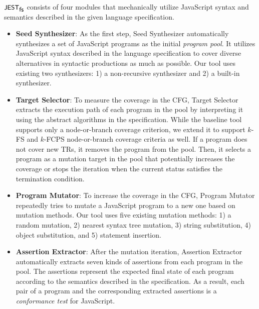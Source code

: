 $\textsf{\small JEST}_{\textsf{\small fs}}$ consists of four modules that mechanically utilize JavaScript syntax and
semantics described in the given language specification.
\begin{itemize}
  \item \textsf{\textbf{Seed Synthesizer}}:
    As the first step, \textsf{Seed Synthesizer} automatically synthesizes a set
    of JavaScript programs as the initial \textit{program pool}.
    It utilizes JavaScript syntax described in the language specification to
    cover diverse alternatives in syntactic productions as much as possible.
    Our tool uses existing two synthesizers: 1) a non-recursive synthesizer and
    2) a built-in synthesizer.
  \item \textsf{\textbf{Target Selector}}:
    To measure the coverage in the CFG, \textsf{Target Selector} extracts the
    execution path of each program in the pool by interpreting it using the
    abstract algorithms in the specification.
    While the baseline tool supports only a node-or-branch coverage criterion,
    we extend it to support $k$-FS and $k$-FCPS node-or-branch coverage
    criteria as well.
    If a program does not cover new TRs, it removes the program from the pool.
    Then, it selects a program as a mutation target in the pool that potentially
    increases the coverage or stops the iteration when the current status
    satisfies the termination condition.
  \item \textsf{\textbf{Program Mutator}}:
    To increase the coverage in the CFG, \textsf{Program Mutator} repeatedly
    tries to mutate a JavaScript program to a new one based on mutation methods.
    Our tool uses five existing mutation methods: 1) a random mutation, 2)
    nearest syntax tree mutation, 3) string substitution, 4) object
    substitution, and 5) statement insertion.
  \item \textsf{\textbf{Assertion Extractor}}:
    After the mutation iteration, \textsf{Assertion Extractor} automatically
    extracts seven kinds of assertions from each program in the pool.
    The assertions represent the expected final state of each program according
    to the semantics described in the specification.
    As a result, each pair of a program and the corresponding extracted
    assertions is a \textit{conformance test} for JavaScript.
\end{itemize}


